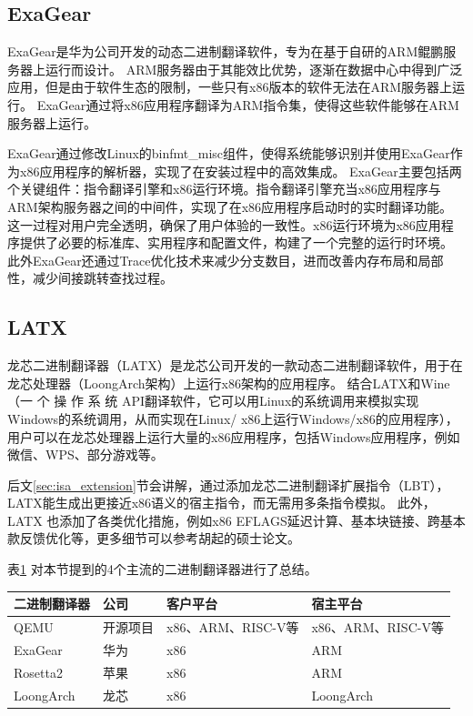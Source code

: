 \subsection{ExaGear}

ExaGear是华为公司开发的动态二进制翻译软件，专为在基于自研的ARM鲲鹏服务器上运行而设计。
ARM服务器由于其能效比优势，逐渐在数据中心中得到广泛应用，但是由于软件生态的限制，一些只有x86版本的软件无法在ARM服务器上运行。
ExaGear通过将x86应用程序翻译为ARM指令集，使得这些软件能够在ARM服务器上运行。

ExaGear通过修改Linux的binfmt\_misc组件，使得系统能够识别并使用ExaGear作为x86应用程序的解析器，实现了在安装过程中的高效集成。
ExaGear主要包括两个关键组件：指令翻译引擎和x86运行环境。指令翻译引擎充当x86应用程序与ARM架构服务器之间的中间件，实现了在x86应用程序启动时的实时翻译功能。
这一过程对用户完全透明，确保了用户体验的一致性。x86运行环境为x86应用程序提供了必要的标准库、实用程序和配置文件，构建了一个完整的运行时环境。
此外ExaGear还通过Trace优化技术来减少分支数目，进而改善内存布局和局部性，减少间接跳转查找过程\cite{LvYandong2021}。

\subsection{LATX}

龙芯二进制翻译器（LATX）是龙芯公司开发的一款动态二进制翻译软件，用于在龙芯处理器（LoongArch架构）上运行x86架构的应用程序。
结合LATX和Wine\cite{amstadt1994wine}（一 个 操 作 系 统 API翻译软件，它可以用Linux的系统调用来模拟实现Windows的系统调用，从而实现在Linux/ x86上运行Windows/x86的应用程序），
用户可以在龙芯处理器上运行大量的x86应用程序，包括Windows应用程序，例如微信、WPS、部分游戏等。

后文\ref{sec:isa_extension}节会讲解，通过添加龙芯二进制翻译扩展指令（LBT），LATX能生成出更接近x86语义的宿主指令，而无需用多条指令模拟。
此外，LATX 也添加了各类优化措施，例如x86 EFLAGS延迟计算、基本块链接、跨基本款反馈优化等，更多细节可以参考胡起的硕士论文\cite{HuQi2023}。

表\ref{tab:BTs} 对本节提到的4个主流的二进制翻译器进行了总结。

\begin{table}[!htbp]
  \centering
  \footnotesize%
  \setlength{\tabcolsep}{4pt}%
  \renewcommand{\arraystretch}{1.2}%
  \label{tab:BTs}
    \begin{tabular}{llll}
    \hline
    二进制翻译器    & 公司   & 客户平台           & 宿主平台           \\ \hline
    QEMU      & 开源项目 & x86、ARM、RISC-V等 & x86、ARM、RISC-V等  \\
    ExaGear   & 华为   & x86            & ARM            \\
    Rosetta2  & 苹果   & x86            & ARM            \\
    LoongArch & 龙芯   & x86            & LoongArch      \\ \hline
    \end{tabular}
    \end{table}

